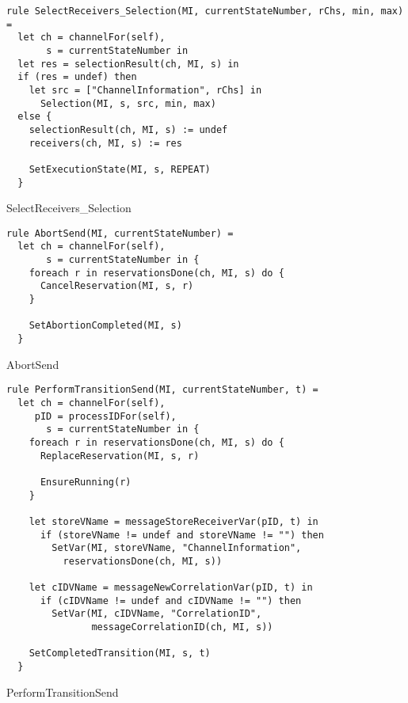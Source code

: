 \begin{listing}[H]
\begin{verbatim}
rule SelectReceivers_Selection(MI, currentStateNumber, rChs, min, max) =
  let ch = channelFor(self),
       s = currentStateNumber in
  let res = selectionResult(ch, MI, s) in
  if (res = undef) then
    let src = ["ChannelInformation", rChs] in
      Selection(MI, s, src, min, max)
  else {
    selectionResult(ch, MI, s) := undef
    receivers(ch, MI, s) := res

    SetExecutionState(MI, s, REPEAT)
  }
\end{verbatim}
\caption{SelectReceivers_Selection}
\label{lst:asm:SelectReceivers_Selection}
\end{listing}




\begin{listing}[H]
\begin{verbatim}
rule AbortSend(MI, currentStateNumber) =
  let ch = channelFor(self),
       s = currentStateNumber in {
    foreach r in reservationsDone(ch, MI, s) do {
      CancelReservation(MI, s, r)
    }

    SetAbortionCompleted(MI, s)
  }
\end{verbatim}
\caption{AbortSend}
\label{lst:asm:AbortSend}
\end{listing}




\begin{listing}[H]
\begin{verbatim}
rule PerformTransitionSend(MI, currentStateNumber, t) =
  let ch = channelFor(self),
     pID = processIDFor(self),
       s = currentStateNumber in {
    foreach r in reservationsDone(ch, MI, s) do {
      ReplaceReservation(MI, s, r)

      EnsureRunning(r)
    }

    let storeVName = messageStoreReceiverVar(pID, t) in
      if (storeVName != undef and storeVName != "") then
        SetVar(MI, storeVName, "ChannelInformation",
          reservationsDone(ch, MI, s))

    let cIDVName = messageNewCorrelationVar(pID, t) in
      if (cIDVName != undef and cIDVName != "") then
        SetVar(MI, cIDVName, "CorrelationID",
               messageCorrelationID(ch, MI, s))

    SetCompletedTransition(MI, s, t)
  }
\end{verbatim}
\caption{PerformTransitionSend}
\label{lst:asm:PerformTransitionSend}
\end{listing}




